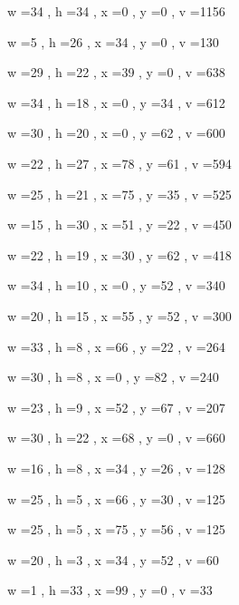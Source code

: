 \documentclass[11pt]{article}
\begin{document}
w =34 , h =34 , x =0 , y =0 , v =1156
\par
w =5 , h =26 , x =34 , y =0 , v =130
\par
w =29 , h =22 , x =39 , y =0 , v =638
\par
w =34 , h =18 , x =0 , y =34 , v =612
\par
w =30 , h =20 , x =0 , y =62 , v =600
\par
w =22 , h =27 , x =78 , y =61 , v =594
\par
w =25 , h =21 , x =75 , y =35 , v =525
\par
w =15 , h =30 , x =51 , y =22 , v =450
\par
w =22 , h =19 , x =30 , y =62 , v =418
\par
w =34 , h =10 , x =0 , y =52 , v =340
\par
w =20 , h =15 , x =55 , y =52 , v =300
\par
w =33 , h =8 , x =66 , y =22 , v =264
\par
w =30 , h =8 , x =0 , y =82 , v =240
\par
w =23 , h =9 , x =52 , y =67 , v =207
\par
w =30 , h =22 , x =68 , y =0 , v =660
\par
w =16 , h =8 , x =34 , y =26 , v =128
\par
w =25 , h =5 , x =66 , y =30 , v =125
\par
w =25 , h =5 , x =75 , y =56 , v =125
\par
w =20 , h =3 , x =34 , y =52 , v =60
\par
w =1 , h =33 , x =99 , y =0 , v =33
\par
\newpage
\end{document}
